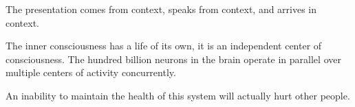 

The presentation comes from context, speaks from context, and arrives
in context.

The inner consciousness has a life of its own, it is an independent
center of consciousness.  The hundred billion neurons in the brain
operate in parallel over multiple centers of activity concurrently.

An inability to maintain the health of this system will actually hurt
other people.

\bye
